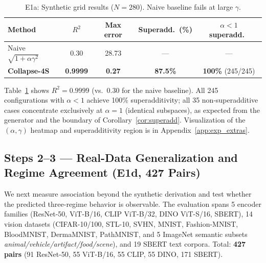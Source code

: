 \documentclass{article}
\begin{document}
\begin{table}[t]
\centering
\caption{E1a: Synthetic grid results ($N=280$). Naive baseline fails at large $\gamma$.}
\label{tab:e1a}
\begin{tabular}{lcccc}
\toprule
Method & $R^2$ & Max error & Superadd.\ (\%) & $\alpha<1$ superadd.\ \\
\midrule
Naive $\sqrt{1+\alpha\gamma^2}$ & 0.30 & 28.73 & --- & --- \\
\textbf{Collapse-4S} & \textbf{0.9999} & \textbf{0.27} & \textbf{87.5\%} & \textbf{100\%} (245/245) \\
\bottomrule
\end{tabular}
\end{table}

Table~\ref{tab:e1a} shows $R^2{=}0.9999$ (vs.\ $0.30$ for the naive baseline).
All 245 configurations with $\alpha{<}1$ achieve 100\% superadditivity;
all 35 non-superadditive cases concentrate exclusively at $\alpha{=}1$
(identical subspaces), as expected from the generator and the boundary of
Corollary~\ref{cor:superadd}.
Visualization of the $(\alpha,\gamma)$ heatmap and superadditivity region
is in Appendix~\ref{app:exp_extras}.

\subsection{Steps 2--3 --- Real-Data Generalization and Regime Agreement (E1d, 427 Pairs)}
\label{sec:e1d}

We next measure association beyond the synthetic derivation and test whether
the predicted three-regime behavior is observable.
The evaluation spans
5 encoder families (ResNet-50, ViT-B/16, CLIP ViT-B/32, DINO ViT-S/16, SBERT),
14 vision datasets (CIFAR-10/100, STL-10, SVHN, MNIST, Fashion-MNIST,
BloodMNIST, DermaMNIST, PathMNIST, and 5 ImageNet semantic subsets
\emph{animal/vehicle/artifact/food/scene}),
and 19 SBERT text corpora.
Total: \textbf{427 pairs} (91 ResNet-50, 55 ViT-B/16, 55 CLIP, 55 DINO, 171 SBERT).
\end{document}
